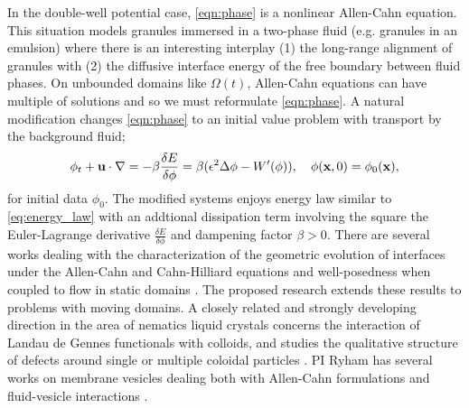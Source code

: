 In the double-well potential case, \eqref{eqn:phase}
is a nonlinear Allen-Cahn
equation.
This situation models granules immersed in a two-phase fluid
(e.g. granules in an emulsion) 
where there is an interesting interplay
(1) the long-range alignment of granules with (2) 
the diffusive interface energy of the free boundary
between fluid phases.
On unbounded domains like $\Omega(t)$,
Allen-Cahn equations can have multiple of solutions
\cite{Alama1997StationaryLS,Alikakos2008OnAE,Bronsard1993OnTB,
  Byeon2014SolutionsOH, Byeon2013OnAP, Alessio2005ENTIRESI,
  Trumper2007ExistenceOA,Benci2019MultipleSF}
and so we must reformulate
\eqref{eqn:phase}.
A natural modification changes
\eqref{eqn:phase} to an initial value problem with
transport by the background fluid;
\begin{equation}
  \label{eqn:phase_transport}
  \phi_t + \mathbf{u} \cdot \nabla
  = -\beta \frac{\delta E}{\delta \phi}
  =  \beta(\epsilon^2 \Delta \phi - W'(\phi)),
  \quad \phi(\mathbf{x},0) = \phi_0(\mathbf{x}),
\end{equation}
for initial data $\phi_0$.
The modified systems enjoys energy law similar to \eqref{eq:energy_law} 
with an addtional dissipation term involving the square 
the Euler-Lagrange derivative $\frac{\delta E}{\delta \phi}$ and dampening factor $\beta > 0$.
There are several works dealing with the
characterization of the geometric evolution
of interfaces under the Allen-Cahn and Cahn-Hilliard equations
\cite{Christlieb2019CompetitionAC, Gavish2011CurvatureDF, Dai2019WeakSF,
  Promislow2017ExistenceBA, Dai2015CompetitiveGE, Promislow2012CriticalPO,
  Dai2022GeometricEO, Dai2020MinimizersFT,Dai2013GeometricEO,Promislow2022UndulatedBI} and
well-posedness when coupled to flow in static domains
\cite{Jiang2017TwophaseIF, Liu2012StrongSF, Giorgini2019WellPosednessOA,
Wu2022WellposednessOA, Gal2010AsymptoticBO,
Giorgini2020DiffuseIM,Giorgini2019UniquenessAR}.
The proposed research extends these results to
problems with moving domains.
A closely related and strongly developing direction in
the area of nematics liquid crystals concerns the interaction of
Landau de Gennes functionals with colloids, and studies
the qualitative structure of defects around single or multiple
coloidal particles
\cite{doi:10.1098/rsta.2020.0432, Alama2015MinimizersOT, Alama2021SaturnRD, PhysRevE.96.042702}.
PI Ryham has several works on membrane vesicles
dealing both with Allen-Cahn formulations
and fluid-vesicle interactions 
\cite{QiangDu09, RYHAM20112929, RyCoEi12,Ryham2017OnTV}.

